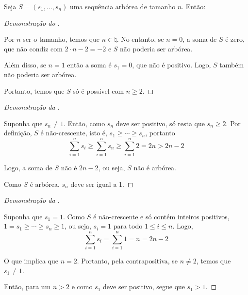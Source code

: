 \begin{proposition}
    Seja $S = (s_1, \ldots, s_n)$ uma sequência arbórea de tamanho $n$. Então:

\end{proposition}

\begin{proof}[Demonstração do ]~

    Por $n$ ser o tamanho, temos que $n \in \natural$. No entanto, se $n = 0$, a soma de $S$ é zero, que não condiz com $2 \cdot n - 2 = -2$ e $S$ não poderia ser arbórea.

    Além disso, se $n = 1$ então a soma é $s_1 = 0$, que não é positivo. Logo, $S$ também não poderia ser arbórea.

    Portanto, temos que $S$ só é possível com $n \geq 2$.
\end{proof}

\begin{proof}[Demonstração da ]~

    Suponha que $s_n \ne 1$. Então, como $s_n$ deve ser positivo, só resta que $s_n \geq 2$. Por definição, $S$ é não-crescente, isto é, $s_1 \geq \cdots \geq s_n$, portanto
    \[
        \sum_{i = 1}^n s_i \geq \sum_{i = 1}^n s_n \geq \sum_{i = 1}^n 2 = 2 n > 2 n - 2
    \]

    Logo, a soma de $S$ não é $2n - 2$, ou seja, $S$ não é arbórea.

    Como $S$ é arbórea, $s_n$ deve ser igual a 1.
\end{proof}

\begin{proof}[Demonstração da ]~

    Suponha que $s_1 = 1$. Como $S$ é não-crescente e só contém inteiros positivos, $1 = s_1 \geq \cdots \geq s_n \geq 1$, ou seja, $s_i = 1$ para todo $1 \leq i \leq n$. Logo,
    \[
        \sum_{i = 1}^n s_i = \sum_{i = 1}^n 1 = n = 2n - 2
    \]

    O que implica que $n = 2$. Portanto, pela contrapositiva, se $n \ne 2$, temos que $s_1 \ne 1$.

    Então, para um $n > 2$ e como $s_1$ deve ser positivo, segue que $s_1 > 1$.
\end{proof}
